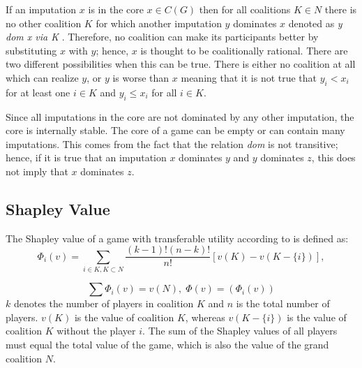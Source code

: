 If an imputation $x$ is in the core $x \in C(G)$ then for all coalitions $K \in N$ there is no other coalition $K$ for which another imputation $y$ dominates $x$ denoted as \textit{y dom x via K} \citep{holler2006einfuhrung}. Therefore, no coalition can make its participants better by substituting $x$ with $y$; hence, $x$ is thought to be coalitionally rational. There are two different possibilities when this can be true. There is either no coalition at all which can realize $y$, or $y$ is worse than $x$ meaning that it is not true that $y_i < x_i$ for at least one $i \in K$ and $y_i \leq x_i$ for all $i \in K$. 

Since all imputations in the core are not dominated by any other imputation, the core is internally stable. The core of a game can be empty or can contain many imputations. This comes from the fact that the relation \textit{dom} is not transitive; hence, if it is true that an imputation $x$ dominates $y$ and $y$ dominates $z$, this does not imply that $x$ dominates $z$.

\subsection{Shapley Value}

The Shapley value of a game with transferable utility according to \citet{holler2006einfuhrung} is defined as:
\begin{equation}
\label{eq:shapley}
\Phi_i(v) = \sum_{i \in K, K \subset N} \frac{(k-1)!(n-k)!}{n!} [ v(K) - v(K - \{i\})],
\end{equation}

\begin{equation}
\sum \Phi_i(v) = v(N), \; \Phi(v) = (\Phi_i(v))
\end{equation}
$k$ denotes the number of players in coalition $K$ and $n$ is the total number of players. $v(K)$ is the value of coalition $K$, whereas $v(K - \{i\})$ is the value of coalition $K$ without the player $i$. The sum of the Shapley values of all players must equal the total value of the game, which is also the value of the grand coalition $N$.

